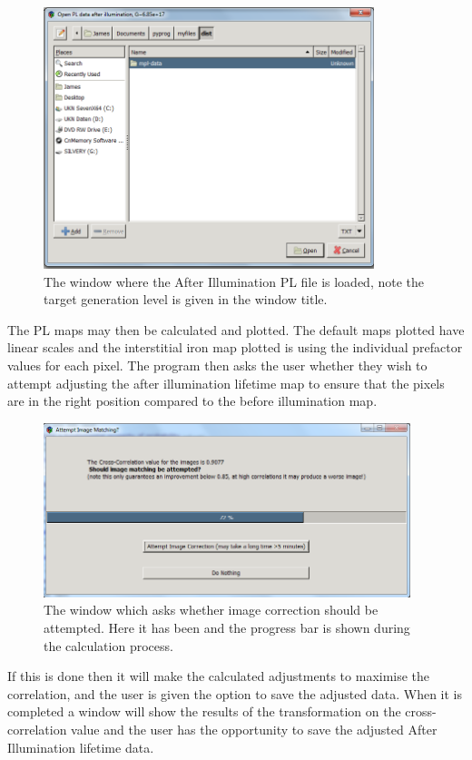 \documentclass[final,a4paper,oneside,12pt]{article}
\begin{document}
\begin{figure}[h!]
\includegraphics[height=3in]{2loadplafterfile} 
\caption{\label{figure2} The window where the After Illumination PL file is loaded, note the target generation level is given in the window title.}
\end{figure}


 The PL maps may then be calculated and plotted. The default maps plotted have linear scales and the interstitial iron map plotted is using the individual prefactor values for each pixel. The program then asks the user whether they wish to attempt adjusting the after illumination lifetime map to ensure that the pixels are in the right position compared to the before illumination map.\\

\begin{figure}[h!]
\includegraphics[height=2in]{2attemptcorrection}
\caption{\label{figure2} The window which asks whether image correction should be attempted. Here it has been and the progress bar is shown during the calculation process.}
\end{figure}

If this is done then it will make the calculated adjustments to maximise the correlation, and the user is given the option to save the adjusted data. When it is completed a window will show the results of the transformation on the cross-correlation value and the user has the opportunity to save the adjusted After Illumination lifetime data.
\end{document}
